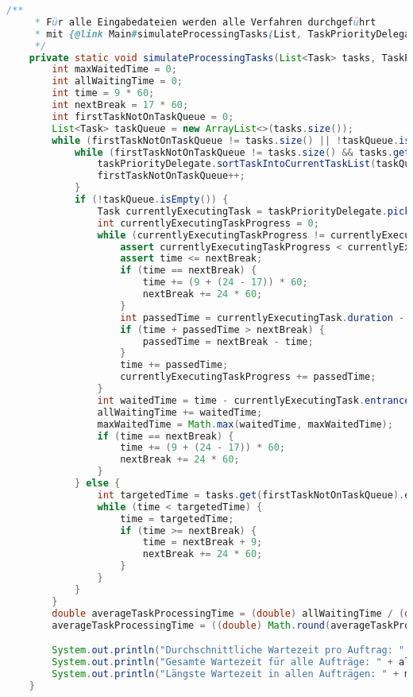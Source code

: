 \documentclass[a4paper,10pt,ngerman]{scrartcl}
\begin{document}
\begin{lstlisting}[frame=single,language=Java,title=Methode simulateProcessingTasks,breaklines=true]
	/**
     * Für alle Eingabedateien werden alle Verfahren durchgeführt
     * mit {@link Main#simulateProcessingTasks(List, TaskPriorityDelegate)}.
     */
	private static void simulateProcessingTasks(List<Task> tasks, TaskPriorityDelegate taskPriorityDelegate) {
        int maxWaitedTime = 0;
        int allWaitingTime = 0;
        int time = 9 * 60;
        int nextBreak = 17 * 60;
        int firstTaskNotOnTaskQueue = 0;
        List<Task> taskQueue = new ArrayList<>(tasks.size());
        while (firstTaskNotOnTaskQueue != tasks.size() || !taskQueue.isEmpty()) {
            while (firstTaskNotOnTaskQueue != tasks.size() && tasks.get(firstTaskNotOnTaskQueue).entranceTime <= time) {
                taskPriorityDelegate.sortTaskIntoCurrentTaskList(taskQueue, tasks.get(firstTaskNotOnTaskQueue));
                firstTaskNotOnTaskQueue++;
            }
            if (!taskQueue.isEmpty()) {
                Task currentlyExecutingTask = taskPriorityDelegate.pickTask(taskQueue);
                int currentlyExecutingTaskProgress = 0;
                while (currentlyExecutingTaskProgress != currentlyExecutingTask.duration) {
                    assert currentlyExecutingTaskProgress < currentlyExecutingTask.duration;
                    assert time <= nextBreak;
                    if (time == nextBreak) {
                        time += (9 + (24 - 17)) * 60;
                        nextBreak += 24 * 60;
                    }
                    int passedTime = currentlyExecutingTask.duration - currentlyExecutingTaskProgress;
                    if (time + passedTime > nextBreak) {
                        passedTime = nextBreak - time;
                    }
                    time += passedTime;
                    currentlyExecutingTaskProgress += passedTime;
                }
                int waitedTime = time - currentlyExecutingTask.entranceTime;
                allWaitingTime += waitedTime;
                maxWaitedTime = Math.max(waitedTime, maxWaitedTime);
                if (time == nextBreak) {
                    time += (9 + (24 - 17)) * 60;
                    nextBreak += 24 * 60;
                }
            } else {
                int targetedTime = tasks.get(firstTaskNotOnTaskQueue).entranceTime;
                while (time < targetedTime) {
                    time = targetedTime;
                    if (time >= nextBreak) {
                        time = nextBreak + 9;
                        nextBreak += 24 * 60;
                    }
                }
            }
        }
        double averageTaskProcessingTime = (double) allWaitingTime / (double) tasks.size();
        averageTaskProcessingTime = ((double) Math.round(averageTaskProcessingTime * 10)) / 10;

        System.out.println("Durchschnittliche Wartezeit pro Auftrag: " + averageTaskProcessingTime + " minuten");
        System.out.println("Gesamte Wartezeit für alle Aufträge: " + allWaitingTime + " minuten");
        System.out.println("Längste Wartezeit in allen Aufträgen: " + maxWaitedTime + " minuten");
    }
	\end{lstlisting}
\end{document}
